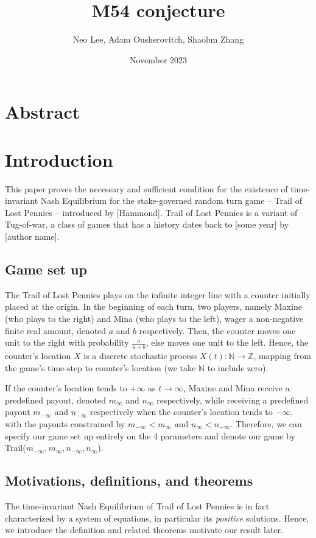 \documentclass{article}
\title{M54 conjecture}
\author{Neo Lee, Adam Ousherovitch, Shaolun Zhang}
\date{November 2023}
\begin{document}
\maketitle

\section{\centering Abstract}

\section{\centering Introduction}
This paper proves the necessary and sufficient condition for the existence of time-invariant Nash
Equilibrium for the stake-governed random turn game -- Trail of Lost Pennies -- introduced by
[Hammond]. Trail of Lost Pennies is a variant of Tug-of-war, a class of games that has a history
dates back to [some year] by [author name]. 

\subsection{\centering Game set up}
The Trail of Lost Pennies plays on the infinite integer line with a counter initially placed at the
origin. In the beginning of each turn, two players, namely Maxine (who plays to the right) and Mina
(who plays to the left), wager a non-negative finite real amount, denoted $a$ and $b$ respectively.
Then, the counter moves one unit to the right with probability $\frac{a}{a+b}$, else moves one unit
to the left. Hence, the counter's location $X$ is a discrete stochastic process
$X(t):\mathbb{N}\to\mathbb{Z}$, mapping from the game's time-step to counter's location (we take
$\mathbb{N}$ to include zero).

If the counter's location tends to $+\infty$ as $t\to\infty$, Maxine and Mina receive a predefined
payout, denoted $m_{\infty}$ and $n_{\infty}$ respectively, while receiving a predefined payout
$m_{-\infty}$ and $n_{-\infty}$ respectively when the counter's location tends to $-\infty$, with
the payouts constrained by $m_{-\infty}<m_{\infty}$ and $n_{\infty} < n_{-\infty}$. Therefore, we
can specify our game set up entirely on the 4 parameters and denote our game by Trail($m_{-\infty},
m_{\infty}, n_{-\infty}, n_{\infty}$).

\subsection{\centering Motivations, definitions, and theorems}
The time-invariant Nash Equilibrium of Trail of Lost Pennies is in fact characterized by a system of
equations, in particular its \emph{positive} solutions. Hence, we introduce the definition and
related theorems motivate our result later.
\end{document}
